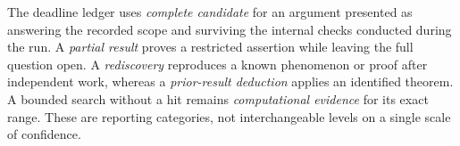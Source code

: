 The deadline ledger uses \emph{complete candidate} for an argument
presented as answering the recorded scope and surviving the internal
checks conducted during the run. A \emph{partial result} proves a
restricted assertion while leaving the full question open.
A \emph{rediscovery} reproduces a known phenomenon or proof after
independent work, whereas a \emph{prior-result deduction} applies an
identified theorem. A bounded search without a hit remains
\emph{computational evidence} for its exact range.
These are reporting categories, not interchangeable levels on a
single scale of confidence.
